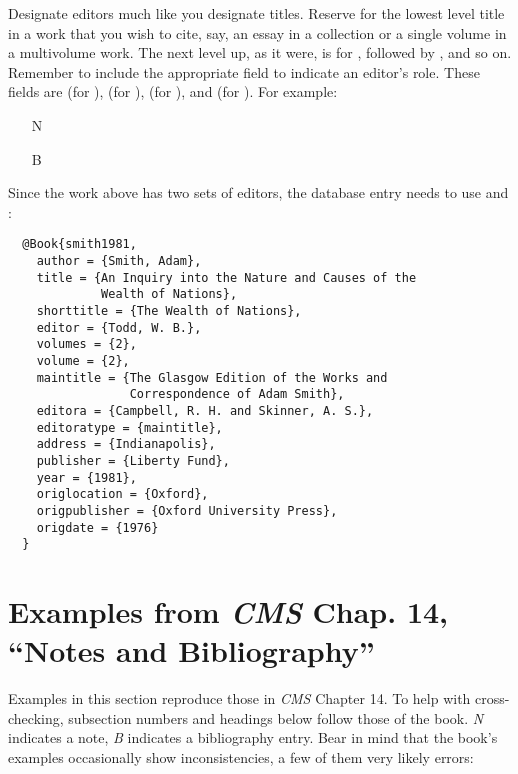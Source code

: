 \documentclass[11pt,letterpaper,oneside]{article}
\begin{document}
Designate editors much like you designate titles. Reserve
 for the lowest level title in a work that you wish
to cite, say, an essay in a collection or a single volume in a
multivolume work. The next level up, as it were, is for
, followed by , and so on.
Remember to include the appropriate  field to indicate
an editor's role. These fields are  (for
),  (for ),
 (for ), and
 (for ). For example:

\begin{itemize}
\item[N] 

\item[B] 
\end{itemize}

\noindent Since the work above has two sets of editors, the database
entry needs to use  and :

\begin{lstlisting}
  @Book{smith1981,
    author = {Smith, Adam},
    title = {An Inquiry into the Nature and Causes of the
             Wealth of Nations},
    shorttitle = {The Wealth of Nations},
    editor = {Todd, W. B.},
    volumes = {2},
    volume = {2},
    maintitle = {The Glasgow Edition of the Works and
                 Correspondence of Adam Smith},
    editora = {Campbell, R. H. and Skinner, A. S.},
    editoratype = {maintitle},
    address = {Indianapolis},
    publisher = {Liberty Fund},
    year = {1981},
    origlocation = {Oxford},
    origpublisher = {Oxford University Press},
    origdate = {1976}
  }
\end{lstlisting}

\section{Examples from \emph{CMS} Chap. 14, ``Notes and
Bibliography''}
\label{notes16}

Examples in this section reproduce those in \textit{CMS} Chapter 14.
To help with cross-checking, subsection numbers and headings below
follow those of the book. \textit{N} indicates a note, \textit{B}
indicates a bibliography entry. Bear in mind that the book's examples
occasionally show inconsistencies, a few of them very likely errors:
\end{document}
